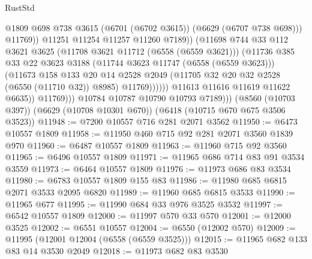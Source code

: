 \begin{lexlean}{RustStd}
\begin{coremodule}
                                    @1809
                                    @698
                                    @738
                                    @3615
                                    (@6701 (@6702 @3615))
                                    (@6629 (@6707 @738 @698)))
                                  @11769))
                              @11251
                              @11254
                              @11257
                              @11260
                              @7189))
                          (@11698
                            @744
                            @33
                            @112
                            @3621
                            @3625
                            (@11708 @3621 @11712 (@6558 (@6559 @3621)))
                            (@11736
                              @385
                              @33
                              @22
                              @3623
                              @3188
                              (@11744 @3623 @11747 (@6558 (@6559 @3623)))
                              (@11673
                                @158
                                @133
                                @20
                                @14
                                @2528
                                @2049
                                (@11705 @32 @20 @32 @2528 (@6550 (@11710 @32)) @8985)
                                @11769))))))
                    @11613
                    @11616
                    @11619
                    @11622
                    @6635))
                @11769)))
          @10784
          @10787
          @10790
          @10793
          @7189)))
    (@8560 (@10703 @397))
    (@6629 (@10708 @10301 @670))
    (@6418 (@10715 @670 @675 @3506 @3523))
@11948 := @7200 @10557 @716 @281 @2071 @3562
@11950 := @6473 @10557 @1809
@11958 := @11950 @460 @715 @92 @281 @2071 @3560 @1839 @970
@11960 := @6487 @10557 @1809
@11963 := @11960 @715 @92 @3560
@11965 := @6496 @10557 @1809
@11971 := @11965 @686 @714 @83 @91 @3534 @3559
@11973 := @6464 @10557 @1809
@11976 := @11973 @686 @83 @3534
@11980 := @6783 @10557 @1809 @155 @83
@11986 := @11980 @685 @6815 @2071 @3533 @2095 @6820
@11989 := @11960 @685 @6815 @3533
@11990 := @11965 @677
@11995 := @11990 @684 @33 @976 @3525 @3532
@11997 := @6542 @10557 @1809
@12000 := @11997 @570 @33 @570
@12001 := @12000 @3525
@12002 := @6551 @10557
@12004 := @6550 (@12002 @570)
@12009 := @11995 (@12001 @12004 (@6558 (@6559 @3525)))
@12015 := @11965 @682 @133 @83 @14 @3530 @2049
@12018 := @11973 @682 @83 @3530

\end{coremodule}
\end{lexlean}
